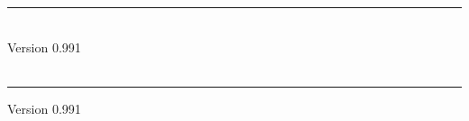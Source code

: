 \documentclass[twocolumn,wd,9pt]{isov2}
\newcommand{\version}{0.991}
\renewcommand{\extrahead}{Version \version}
\begin{document}
\begin{cover}
    \vspace*{\fill}
    \hrule
    \vspace{0.3cm}
    {\Huge \thestandard} \\
    \vspace{0.3cm}
    {\LARGE Version \version} \\
    \ISname \\
    \vspace{0.5cm}
    \hrule
    \clearpage
\end{cover}



\title{}{\thestandard}{\extrahead}






\newpage
\gdef\module{} \newpage

\gdef\module{telos0} \newpage
\gdef\module{threads} \newpage
\gdef\module{condition} \newpage
\gdef\module{eulisp0} \newpage

\label{annex:level-0}

\gdef\module{character} 
\gdef\module{collection} \newpage
\gdef\module{compare} \newpage
\gdef\module{convert} \newpage
\gdef\module{copy} \newpage
\gdef\module{double} \newpage
\gdef\module{mathlib} \newpage
\gdef\module{float} \newpage
\gdef\module{fpint} \newpage
\gdef\module{formatted-io} \newpage
\gdef\module{integer} \newpage
\gdef\module{keyword} \newpage
\gdef\module{list} \newpage
\gdef\module{number} \newpage
\gdef\module{stream} \newpage
\gdef\module{string} \newpage
\gdef\module{symbol} \newpage
\gdef\module{table} \newpage
\gdef\module{vector} \newpage
\gdef\module{level-0}\newpage
\end{document}
